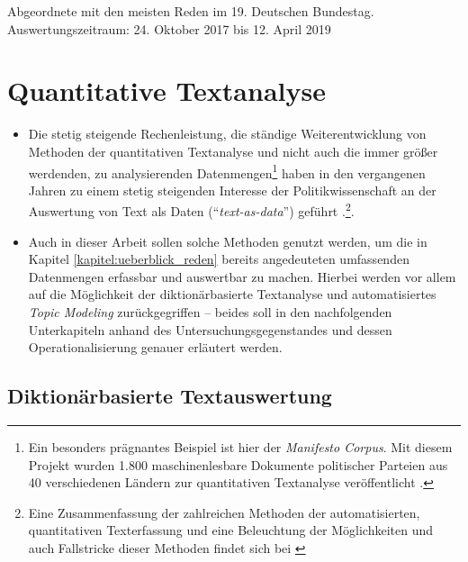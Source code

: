 \documentclass[12pt, 
    twoside=false, 
    bibliography=totoc, 
    numbers=endperiod, 
    headings=normal, 
    toc=chapterentrydotfill
    ]{scrbook}
\begin{document}
\begin{table}[htb]
    \centering
    \caption[Abgeordnete mit den meisten Reden im 19. Deutschen Bundestag.]{Abgeordnete mit den meisten Reden im 19. Deutschen Bundestag. Auswertungszeitraum: 24. Oktober 2017 bis 12. April 2019}
    
    \label{table:top_redner}
\end{table}

\section{Quantitative Textanalyse}

\begin{itemize}
    \item Die stetig steigende Rechenleistung, die ständige Weiterentwicklung von Methoden der quantitativen Textanalyse und nicht auch die immer größer werdenden, zu analysierenden Datenmengen\footnote{Ein besonders prägnantes Beispiel ist hier der \emph{Manifesto Corpus}. Mit diesem Projekt wurden 1.800 maschinenlesbare Dokumente politischer Parteien aus 40 verschiedenen Ländern zur quantitativen Textanalyse veröffentlicht \parencite{merz_2016}.} haben in den vergangenen Jahren zu einem stetig steigenden Interesse der Politikwissenschaft an der Auswertung von Text als Daten (\enquote{\emph{text-as-data}}) geführt \parencite[vgl.][]{wilkerson_2017}.\footnote{Eine Zusammenfassung der zahlreichen Methoden der automatisierten, quantitativen Texterfassung und eine Beleuchtung der Möglichkeiten und auch Fallstricke dieser Methoden findet sich bei \textcite{grimmer_2013}}.
    \item Auch in dieser Arbeit sollen solche Methoden genutzt werden, um die in Kapitel \ref{kapitel:ueberblick_reden} bereits angedeuteten umfassenden Datenmengen erfassbar und auswertbar zu machen. Hierbei werden vor allem auf die Möglichkeit der diktionärbasierte Textanalyse und automatisiertes \emph{Topic Modeling} zurückgegriffen -- beides soll in den nachfolgenden Unterkapiteln anhand des Untersuchungsgegenstandes und dessen Operationalisierung genauer erläutert werden.
\end{itemize}

\subsection{Diktionärbasierte Textauswertung}
\end{document}
